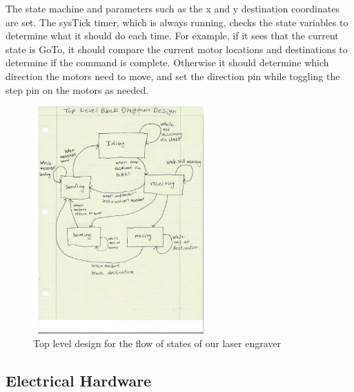 \documentclass[11pt]{LaTeX-Classes/math-hw}
\begin{document}
The state machine and parameters such as the x and y destination coordinates are set.
The sysTick timer, which is always running, checks the state variables to determine what it should
do each time. For example, if it sees that the current state is GoTo, it should compare the current
motor locations and destinations to determine if the command is complete. Otherwise it should
determine which direction the motors need to move, and set the direction pin while toggling
the step pin on the motors as needed.


 \begin{figure}[H]
   \begin{center}
     \includegraphics[width=0.6\textwidth]{blockdiagram}
     \caption{Top level design for the flow of states of our laser engraver}
     \label{fig:blockdiagram}
   \end{center}
 \end{figure}

\subsection{Electrical Hardware}
\end{document}
